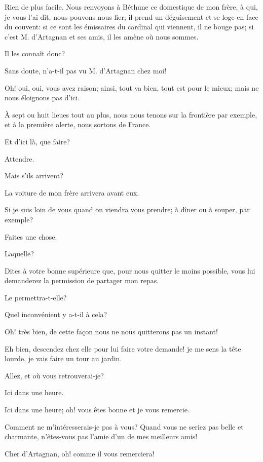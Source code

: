 \speak  Rien de plus facile. Nous renvoyons à Béthune ce domestique de mon frère, à qui, je vous l'ai dit, nous pouvons nous fier; il prend un déguisement et se loge en face du couvent: si ce sont les émissaires du cardinal qui viennent, il ne bouge pas; si c'est M. d'Artagnan et ses amis, il les amène où nous sommes. 

\speak  Il les connaît donc? 

\speak  Sans doute, n'a-t-il pas vu M. d'Artagnan chez moi! 

\speak  Oh! oui, oui, vous avez raison; ainsi, tout va bien, tout est pour le mieux; mais ne nous éloignons pas d'ici. 

\speak  À sept ou huit lieues tout au plus, nous nous tenons sur la frontière par exemple, et à la première alerte, nous sortons de France. 

\speak  Et d'ici là, que faire? 

\speak  Attendre. 

\speak  Mais s'ils arrivent? 

\speak  La voiture de mon frère arrivera avant eux. 

\speak  Si je suis loin de vous quand on viendra vous prendre; à dîner ou à souper, par exemple? 

\speak  Faites une chose. 

\speak  Laquelle? 

\speak  Dites à votre bonne supérieure que, pour nous quitter le moins possible, vous lui demanderez la permission de partager mon repas. 

\speak  Le permettra-t-elle? 

\speak  Quel inconvénient y a-t-il à cela? 

\speak  Oh! très bien, de cette façon nous ne nous quitterons pas un instant! 

\speak  Eh bien, descendez chez elle pour lui faire votre demande! je me sens la tête lourde, je vais faire un tour au jardin. 

\speak  Allez, et où vous retrouverai-je? 

\speak  Ici dans une heure. 

\speak  Ici dans une heure; oh! vous êtes bonne et je vous remercie. 

\speak  Comment ne m'intéresserais-je pas à vous? Quand vous ne seriez pas belle et charmante, n'êtes-vous pas l'amie d'un de mes meilleurs amis! 

\speak  Cher d'Artagnan, oh! comme il vous remerciera! 

